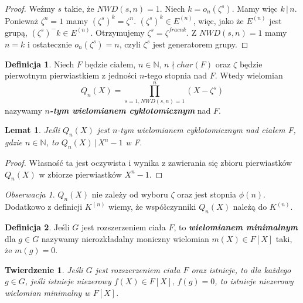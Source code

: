 \documentclass[declaration,shortabstract]{iithesis}
\theoremstyle{definition}
\newtheorem{definition}{Definicja}
\theoremstyle{remark} \newtheorem{observation}{Obserwacja}
\theoremstyle{plain} \newtheorem{theorem}{Twierdzenie}
\theoremstyle{plain} \newtheorem{lemma}{Lemat}
\theoremstyle{remark} \newtheorem*{remark*}{Uwaga}
\theoremstyle{reminder} \newtheorem*{reminder*}{Przypomnienie}
\begin{document}
\begin{proof}
	Weźmy $s$ takie, że $NWD(s, n) = 1$. Niech $k = o_n(\zeta^s)$. Mamy więc $k \, | \, n$. Ponieważ $\zeta^n = 1$ mamy $(\zeta^s)^k = \zeta^n$. $(\zeta^s)^k \in E^{(n)}$, więc, jako że $E^{(n)}$ jest grupą, $(\zeta^s)^-k \in E^{(n)}$. Otrzymujemy $\zeta^s = \zeta^{frac{n}{k}}$. Z $NWD(s, n) = 1$ mamy $n = k$ i ostatecznie $o_n(\zeta^s) = n$, czyli $\zeta^s$ jest generatorem grupy. 
\end{proof}
	
\begin{definition}
	Niech $F$ będzie ciałem, $n \in \mathbb{N}, \, n \nmid char(F)$ oraz $\zeta$ będzie pierwotnym pierwiastkiem z jedności $n$-tego stopnia nad $F$. Wtedy wielomian \[Q_n(X) = \prod_{s = 1, NWD(s, n) = 1}^{n}(X - \zeta^s)\] nazywamy \textit{\textbf{$n$-tym wielomianem cyklotomicznym}} nad $F$.
\end{definition}
	
\begin{lemma}\label{cyklo_dzieli}
	Jeśli $Q_n(X)$ jest $n$-tym wielomianem cyklotomicznym nad ciałem F, gdzie $n\in \mathbb{N}$, to $Q_n(X) \, | \, X^n - 1$ w F.
\end{lemma}
	
\begin{proof} 
	Własność ta jest oczywista i wynika z zawierania się zbioru pierwiastków $Q_n(X)$ w zbiorze pierwiastków $X^n - 1$.
\end{proof}
	
\begin{observation}
	$Q_n(X)$ nie zależy od wyboru $\zeta$ oraz jest stopnia $\phi(n)$. Dodatkowo z definicji $K^{(n)}$ wiemy, że współczynniki $Q_n(X)$ należą do $K^{(n)}$.
\end{observation}
    

\begin{definition}
	Jeśli $G$ jest rozszerzeniem ciała $F$, to \textbf{\textit{wielomianem minimalnym}} dla $g \in G$ nazywamy nierozkładalny moniczny wielomian $m(X) \in F[X]$ taki, że $m(g) = 0$.
\end{definition}
	
\begin{theorem}
	Jeśli $G$ jest rozszerzeniem ciała $F$ oraz istnieje, to dla każdego $g \in G$, jeśli istnieje niezerowy $f(X) \in F[X], \, f(g) = 0$, to istnieje niezerowy wielomian minimalny w $F[X]$.
\end{theorem}
	
\end{document}

